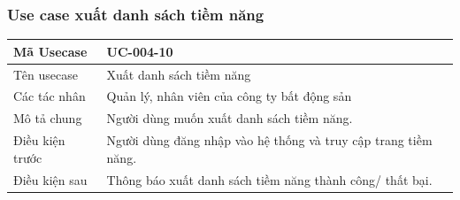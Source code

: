 \documentclass[12pt,a4paper]{article}
\begin{document}
    \subsubsection*{Use case xuất danh sách tiềm năng}
    \begin{table}[H]
        \centering
        \begin{tabular}{|p{3.5cm}|p{11.5cm}|c|}
            \hline
            Mã Usecase      & UC-004-10                                                      \\
            \hline
            Tên usecase     & Xuất danh sách tiềm năng                                       \\
            \hline
            Các tác nhân    & Quản lý, nhân viên của công ty bất động sản                    \\
            \hline
            Mô tả chung     & Người dùng muốn xuất danh sách tiềm năng.                      \\
            \hline

            Điều kiện trước & Người dùng đăng nhập vào hệ thống và truy cập trang tiềm năng. \\
            \hline

            Điều kiện sau   & Thông báo xuất danh sách tiềm năng thành công/ thất bại.       \\
            \hline


\end{tabular}
\end{table}
\end{document}
